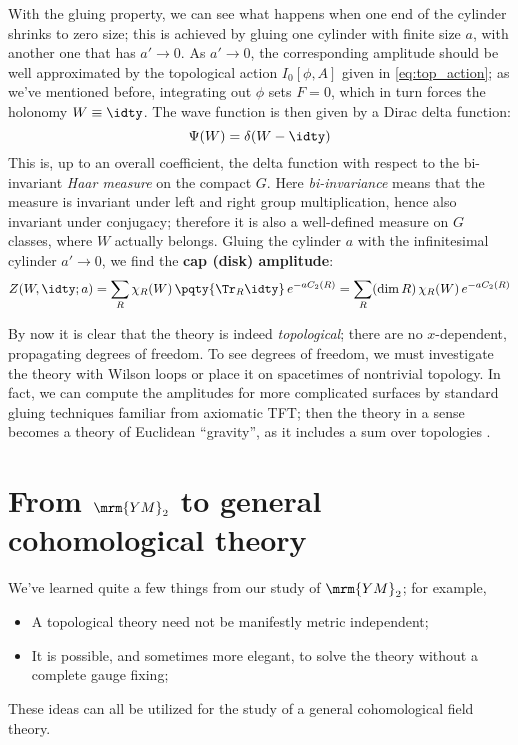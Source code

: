 \documentclass[a4paper
	,10pt
]{article}
\newcommand{\YM}{{\ensuremath{\mrm{YM}_2}}\xspace}
\begin{document}
	With the gluing property, we can see what happens when one end of the cylinder shrinks to zero size; this is achieved by gluing one cylinder with finite size $a$, with another one that has $a'\to 0$. As $a'\to 0$, the corresponding amplitude should be well approximated by the topological action $I_0[\phi,A]$ given in \eqref{eq:top_action}; as we've mentioned before, integrating out $\phi$ sets $F = 0$, which in turn forces the holonomy $W \equiv \idty$. The wave function is then given by a Dirac delta function:
	\begin{equation}
		\Psi(W) = \delta(W - \idty)
	\end{equation}
	This is, up to an overall coefficient, the delta function with respect to the bi-invariant \textit{Haar measure} on the compact $G$. Here \textit{bi-invariance} means that the measure is invariant under left and right group multiplication, hence also invariant under conjugacy; therefore it is also a well-defined measure on $G$ classes, where $W$ actually belongs. Gluing the cylinder $a$ with the infinitesimal cylinder $a'\to 0$, we find the \textbf{cap (disk) amplitude}:
	\begin{equation}
		Z(W,\idty;a)
		= \sum_R \chi_R(W)\,
			\pqty{\Tr_R \idty}\,
			e^{-aC_2(R)}
		= \sum_R (\dim R)\, \chi_R(W)\,
			e^{-aC_2(R)}
	\end{equation}
	
	By now it is clear that the theory is indeed \textit{topological}; there are no $x$-dependent, propagating degrees of freedom. To see degrees of freedom, we must investigate the theory with Wilson loops \cite{Cordes:1994fc} or place it on spacetimes of nontrivial topology. 
	In fact, we can compute the amplitudes for more complicated surfaces by standard gluing techniques familiar from axiomatic TFT; then the theory in a sense becomes a theory of Euclidean ``gravity'', as it includes a sum over topologies \cite{Cordes:1994fc}.

\section{From \YM to general cohomological theory}
	We've learned quite a few things from our study of \YM; for example, 
	\begin{itemize}[noitemsep,leftmargin=*]
	\item A topological theory need not be manifestly metric independent;
	\item It is possible, and sometimes more elegant, to solve the theory without a complete gauge fixing;
	\end{itemize}
	These ideas can all be utilized for the study of a general cohomological field theory.
	
\end{document}
